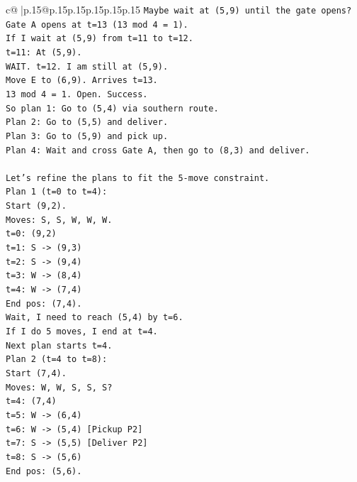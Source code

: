 \documentclass{article}
\begin{document}
{\begin{supertabular}{c@{$\;$}|p{.15\linewidth}@{}p{.15\linewidth}p{.15\linewidth}p{.15\linewidth}p{.15\linewidth}p{.15\linewidth}}
{{{\texttt{Maybe wait at (5,9) until the gate opens?} \\
\texttt{Gate A opens at t=13 (13 mod 4 = 1).} \\
\texttt{If I wait at (5,9) from t=11 to t=12.} \\
\texttt{t=11: At (5,9).} \\
\texttt{WAIT. t=12. I am still at (5,9).} \\
\texttt{Move E to (6,9). Arrives t=13.} \\
\texttt{13 mod 4 = 1. Open. Success.} \\
\texttt{So plan 1: Go to (5,4) via southern route.} \\
\texttt{Plan 2: Go to (5,5) and deliver.} \\
\texttt{Plan 3: Go to (5,9) and pick up.} \\
\texttt{Plan 4: Wait and cross Gate A, then go to (8,3) and deliver.} \\
\\ 
\texttt{Let's refine the plans to fit the 5{-}move constraint.} \\
\texttt{Plan 1 (t=0 to t=4):} \\
\texttt{Start (9,2).} \\
\texttt{Moves: S, S, W, W, W.} \\
\texttt{t=0: (9,2)} \\
\texttt{t=1: S {-}> (9,3)} \\
\texttt{t=2: S {-}> (9,4)} \\
\texttt{t=3: W {-}> (8,4)} \\
\texttt{t=4: W {-}> (7,4)} \\
\texttt{End pos: (7,4).} \\
\texttt{Wait, I need to reach (5,4) by t=6.} \\
\texttt{If I do 5 moves, I end at t=4.} \\
\texttt{Next plan starts t=4.} \\
\texttt{Plan 2 (t=4 to t=8):} \\
\texttt{Start (7,4).} \\
\texttt{Moves: W, W, S, S, S?} \\
\texttt{t=4: (7,4)} \\
\texttt{t=5: W {-}> (6,4)} \\
\texttt{t=6: W {-}> (5,4) {[}Pickup P2{]}} \\
\texttt{t=7: S {-}> (5,5) {[}Deliver P2{]}} \\
\texttt{t=8: S {-}> (5,6)} \\
\texttt{End pos: (5,6).} \\
}}}
\end{supertabular}}
\end{document}
